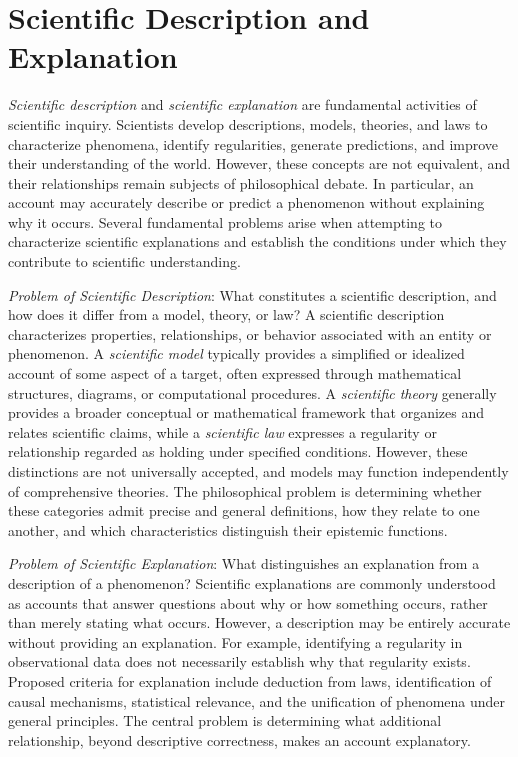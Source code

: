 %
%

\section{Scientific Description and Explanation}
\label{sec:scientific_explanation}

\emph{Scientific description} and \emph{scientific explanation} are fundamental activities of scientific inquiry. Scientists develop descriptions, models, theories, and laws to characterize phenomena, identify regularities, generate predictions, and improve their understanding of the world. However, these concepts are not equivalent, and their relationships remain subjects of philosophical debate. In particular, an account may accurately describe or predict a phenomenon without explaining why it occurs. Several fundamental problems arise when attempting to characterize scientific explanations and establish the conditions under which they contribute to scientific understanding.

\emph{Problem of Scientific Description}: What constitutes a scientific description, and how does it differ from a model, theory, or law? A scientific description characterizes properties, relationships, or behavior associated with an entity or phenomenon. A \emph{scientific model} typically provides a simplified or idealized account of some aspect of a target, often expressed through mathematical structures, diagrams, or computational procedures. A \emph{scientific theory} generally provides a broader conceptual or mathematical framework that organizes and relates scientific claims, while a \emph{scientific law} expresses a regularity or relationship regarded as holding under specified conditions. However, these distinctions are not universally accepted, and models may function independently of comprehensive theories. The philosophical problem is determining whether these categories admit precise and general definitions, how they relate to one another, and which characteristics distinguish their epistemic functions.

\emph{Problem of Scientific Explanation}: What distinguishes an explanation from a description of a phenomenon? Scientific explanations are commonly understood as accounts that answer questions about why or how something occurs, rather than merely stating what occurs. However, a description may be entirely accurate without providing an explanation. For example, identifying a regularity in observational data does not necessarily establish why that regularity exists. Proposed criteria for explanation include deduction from laws, identification of causal mechanisms, statistical relevance, and the unification of phenomena under general principles. The central problem is determining what additional relationship, beyond descriptive correctness, makes an account explanatory.

